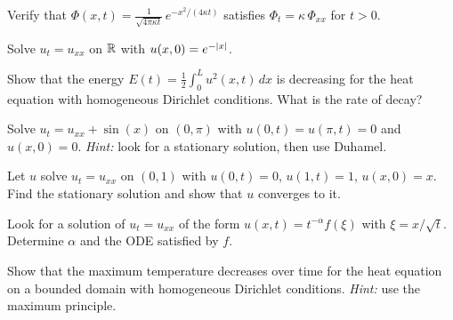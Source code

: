 \begin{exercise}
Verify that $\Phi(x,t) = \frac{1}{\sqrt{4\pi\kappa t}}\, e^{-x^2/(4\kappa t)}$
satisfies $\Phi_t = \kappa\, \Phi_{xx}$ for $t > 0$.
\end{exercise}

\begin{exercise}
Solve $u_t = u_{xx}$ on $\mathbb{R}$ with $u(x,0) = e^{-\left| x \right|}$.
\end{exercise}

\begin{exercise}
Show that the energy $E(t) = \frac{1}{2}\int_0^L u^2(x,t)\, dx$ is
decreasing for the heat equation with homogeneous Dirichlet conditions.
What is the rate of decay?
\end{exercise}

\begin{exercise}
Solve $u_t = u_{xx} + \sin(x)$ on $(0,\pi)$ with $u(0,t) = u(\pi,t) = 0$
and $u(x,0) = 0$. \emph{Hint:} look for a stationary solution, then use
Duhamel.
\end{exercise}

\begin{exercise}
Let $u$ solve $u_t = u_{xx}$ on $(0,1)$ with $u(0,t) = 0$, $u(1,t) = 1$,
$u(x,0) = x$. Find the stationary solution and show that $u$ converges
to it.
\end{exercise}

\begin{exercise}
Look for a solution of $u_t = u_{xx}$ of the form
$u(x,t) = t^{-\alpha} f(\xi)$ with $\xi = x/\sqrt{t}$.
Determine $\alpha$ and the ODE satisfied by $f$.
\end{exercise}

\begin{exercise}
Show that the maximum temperature decreases over time for the heat
equation on a bounded domain with homogeneous Dirichlet conditions.
\emph{Hint:} use the maximum principle.
\end{exercise}
